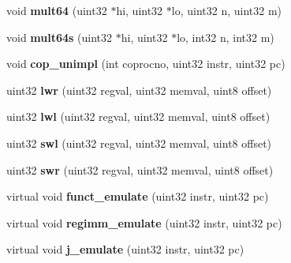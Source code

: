 \begin{DoxyCompactItemize}
\item 
\hypertarget{classCPU_a4351cf31e0eaf15e424bdb33476f42e6}{
void {\bfseries mult64} (uint32 $\ast$hi, uint32 $\ast$lo, uint32 n, uint32 m)}
\label{classCPU_a4351cf31e0eaf15e424bdb33476f42e6}

\item 
\hypertarget{classCPU_a0c8fd1eb3a6ad3f2f33a637ff6f76f01}{
void {\bfseries mult64s} (uint32 $\ast$hi, uint32 $\ast$lo, int32 n, int32 m)}
\label{classCPU_a0c8fd1eb3a6ad3f2f33a637ff6f76f01}

\item 
\hypertarget{classCPU_a715c75aebed3ddb517d7435bce911b8b}{
void {\bfseries cop\_\-unimpl} (int coprocno, uint32 instr, uint32 pc)}
\label{classCPU_a715c75aebed3ddb517d7435bce911b8b}

\item 
\hypertarget{classCPU_a38aa633a220cd3b9fc704f4bb651b518}{
uint32 {\bfseries lwr} (uint32 regval, uint32 memval, uint8 offset)}
\label{classCPU_a38aa633a220cd3b9fc704f4bb651b518}

\item 
\hypertarget{classCPU_af19ad6fc54955e43d233a3c8c0d6eae8}{
uint32 {\bfseries lwl} (uint32 regval, uint32 memval, uint8 offset)}
\label{classCPU_af19ad6fc54955e43d233a3c8c0d6eae8}

\item 
\hypertarget{classCPU_a19ffe3daae5a78ce118f0e293e1e4a44}{
uint32 {\bfseries swl} (uint32 regval, uint32 memval, uint8 offset)}
\label{classCPU_a19ffe3daae5a78ce118f0e293e1e4a44}

\item 
\hypertarget{classCPU_aa1bcf3714f30fdcb8e7439396c7e60f8}{
uint32 {\bfseries swr} (uint32 regval, uint32 memval, uint8 offset)}
\label{classCPU_aa1bcf3714f30fdcb8e7439396c7e60f8}

\item 
\hypertarget{classCPU_a72d2375d4bda77bef899439c7f9b9b0f}{
virtual void {\bfseries funct\_\-emulate} (uint32 instr, uint32 pc)}
\label{classCPU_a72d2375d4bda77bef899439c7f9b9b0f}

\item 
\hypertarget{classCPU_a7f73382ebb68eeb29e5898f2088f3dbb}{
virtual void {\bfseries regimm\_\-emulate} (uint32 instr, uint32 pc)}
\label{classCPU_a7f73382ebb68eeb29e5898f2088f3dbb}

\item 
\hypertarget{classCPU_a6c941506a048425212cda8dff079a9c5}{
virtual void {\bfseries j\_\-emulate} (uint32 instr, uint32 pc)}
\label{classCPU_a6c941506a048425212cda8dff079a9c5}


\end{DoxyCompactItemize}
